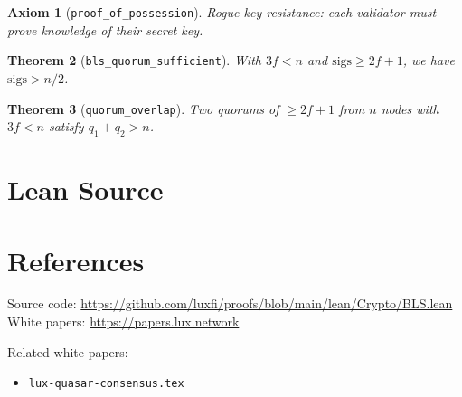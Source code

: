 \documentclass[11pt]{article}
\newtheorem{theorem}{Theorem}
\newtheorem{axiom_stmt}[theorem]{Axiom}
\begin{document}
\begin{axiom_stmt}[\texttt{proof\_of\_possession}]
Rogue key resistance: each validator must prove knowledge of their secret key.
\end{axiom_stmt}

\begin{theorem}[\texttt{bls\_quorum\_sufficient}]
With $3f < n$ and $\text{sigs} \geq 2f+1$, we have $\text{sigs} > n/2$.
\end{theorem}

\begin{theorem}[\texttt{quorum\_overlap}]
Two quorums of $\geq 2f+1$ from $n$ nodes with $3f < n$ satisfy $q_1 + q_2 > n$.
\end{theorem}


\section{Lean Source}


\section{References}
\noindent Source code: \url{https://github.com/luxfi/proofs/blob/main/lean/Crypto/BLS.lean}\\
\noindent White papers: \url{https://papers.lux.network}

\noindent Related white papers:
\begin{itemize}
  \item \texttt{lux-quasar-consensus.tex}
\end{itemize}
\end{document}
